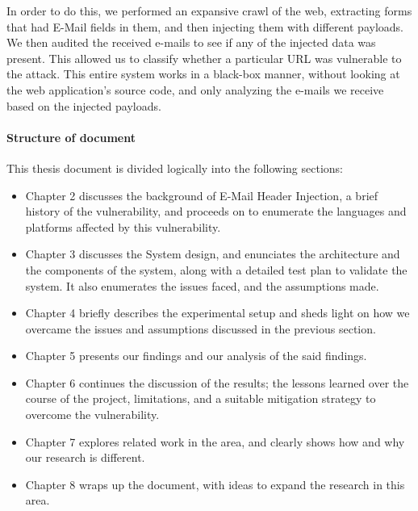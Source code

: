 	In order to do this, we performed an expansive crawl of the web, extracting forms that had E-Mail fields in them, and then injecting them with different payloads. We then audited the received e-mails to see if any of the injected data was present. This allowed us to classify whether a particular URL was vulnerable to the attack. This entire system works in a black-box manner, without looking at the web application's source code, and only analyzing the e-mails we receive based on the injected payloads.

\paragraph{Structure of document} %
This thesis document is divided logically into the following sections:
\begin{itemize}
	\item Chapter 2 discusses the background of E-Mail Header Injection, a brief history of the vulnerability, and proceeds on to enumerate the languages and platforms affected by this vulnerability.
	
	\item Chapter 3 discusses the System design, and enunciates the architecture and the components of the system, along with a detailed test plan to validate the system. It also enumerates the issues faced, and the assumptions made.
	
	\item Chapter 4 briefly describes the experimental setup and sheds light on how we overcame the issues and assumptions discussed in the previous section.
	
	\item Chapter 5 presents our findings and our analysis of the said findings.
	
	\item Chapter 6 continues the discussion of the results; the lessons learned over the course of the project, limitations, and a suitable mitigation strategy to overcome the vulnerability.
	
	\item Chapter 7 explores related work in the area, and clearly shows how and why our research is different.
	
	\item Chapter 8 wraps up the document, with ideas to expand the research in this area.
\end{itemize} 


